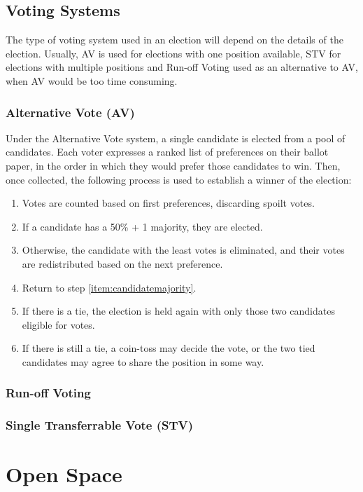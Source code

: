 \documentclass[a4paper, 12pt]{article} %
\begin{document}
\subsection{Voting Systems}
The type of voting system used in an election will depend on the details of the election.  Usually, AV is used for elections with one position available, STV for elections with multiple positions and Run-off Voting used as an alternative to AV, when AV would be too time consuming.

\subsubsection{Alternative Vote (AV)}
\label{sec:av}
Under the Alternative Vote system, a single candidate is elected from a pool of candidates.  Each voter expresses a ranked list of preferences on their ballot paper, in the order in which they would prefer those candidates to win.  Then, once collected, the following process is used to establish a winner of the election:

\begin{enumerate}
\item Votes are counted based on first preferences, discarding spoilt votes.
\item \label{item:candidatemajority} If a candidate has a 50\% + 1 majority, they are elected.
\item Otherwise, the candidate with the least votes is eliminated, and their votes are redistributed based on the next preference.
\item Return to step \ref{item:candidatemajority}.
\item If there is a tie, the election is held again with only those two candidates eligible for votes.
\item If there is still a tie, a coin-toss may decide the vote, or the two tied candidates may agree to share the position in some way.
\end{enumerate}

\subsubsection{Run-off Voting}
\subsubsection{Single Transferrable Vote (STV)}

\appendix

\section{Open Space}
\label{sec:openspace}
\end{document}
